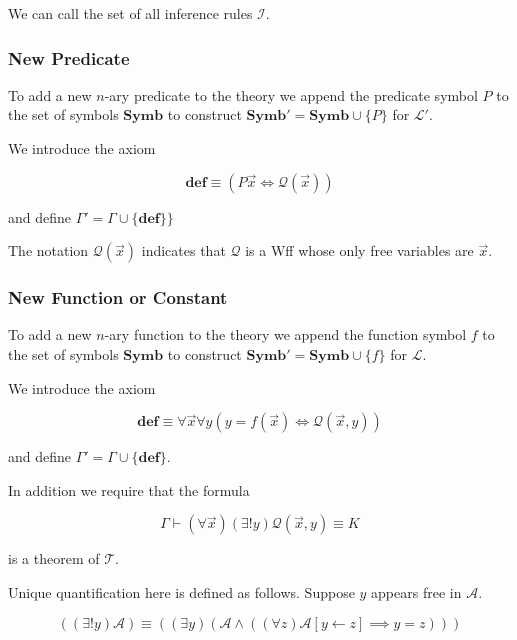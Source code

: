 \documentclass[12pt]{article}
\newcommand{\bv}[1]{\boldsymbol{#1}}
\newcommand{\mc}[1]{\mathcal{#1}}
\newcommand{\bc}[1]{\bv{\mc{#1}}}
\begin{document}
\hrulefill

We can call the set of all inference rules $\bc{I}$.

\subsubsection*{New Predicate}

To add a new $n$-ary predicate to the theory we append the predicate symbol $P$ to the set of symbols $\mathbf{Symb}$ to construct $\mathbf{Symb}' = \mathbf{Symb}\cup \{P\}$ for $\bv{\mc{L}}'$.

We introduce the axiom

\begin{equation}
\textbf{def} \equiv (P\vec{x} \iff \mc{Q}(\vec{x}))
\end{equation}

and define $\Gamma' = \Gamma \cup \{\textbf{def}\} \}$

The notation $\mc{Q}(\vec{x})$ indicates that $\mc{Q}$ is a Wff whose only free variables are $\vec{x}$.

\subsubsection*{New Function or Constant}

To add a new $n$-ary function to the theory we append the function symbol $f$ to the set of symbols $\textbf{Symb}$ to construct $\textbf{Symb}' = \textbf{Symb}\cup\{f\}$ for $\bv{\mc{L}}$.

We introduce the axiom

\begin{equation}
\textbf{def} \equiv \forall \vec{x} \forall y(y=f(\vec{x})\iff \mc{Q}(\vec{x},y))
\end{equation}

and define $\Gamma' = \Gamma \cup \{\textbf{def}\}$.

In addition we require that the formula

\begin{equation}
\Gamma \vdash (\forall \vec{x})(\exists! y) \mc{Q}(\vec{x},y) \equiv K
\end{equation}

is a theorem of $\bc{T}$.

Unique quantification here is defined as follows. Suppose $y$ appears free in $\mc{A}$.

\begin{equation}
((\exists!y)\mc{A}) \equiv ((\exists y)(\mc{A} \land ((\forall z)\mc{A}[y\leftarrow z] \implies y=z)))
\end{equation}
\end{document}
